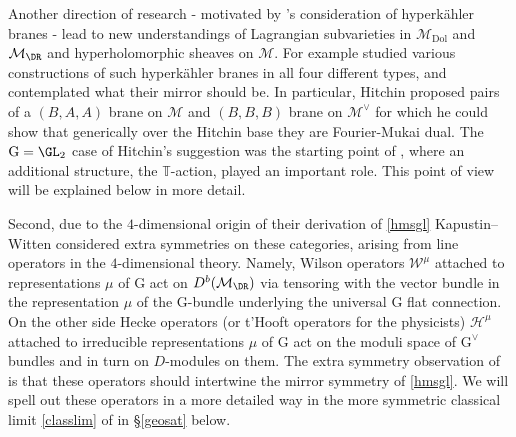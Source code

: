 \documentclass[12pt]{article}
\numberwithin{equation}{section}
\theoremstyle{remark}
\numberwithin{theorem}{section}
\def\M{{\mathcal{M}}}
\newcommand{\T}{{\mathbb{T}}}
\newcommand{\G}{\mathrm{G}}
\newcommand{\Dol}{{\mathrm{Dol}}}
\numberwithin{equation}{section}
\begin{document}

Another direction of research - motivated by \cite{kapustin-witten}'s consideration of hyperk\"ahler branes - lead to new understandings of Lagrangian subvarieties  in $\M_\Dol$ and $\M_\DR$ and hyperholomorphic sheaves on $\M$. For example \cite{baraglia-schaposnik,garcia-prada-etal,hitchin-characteristic} studied various constructions of such hyperk\"ahler branes in all four different types, and contemplated  what their mirror should be. In particular, Hitchin \cite{hitchin-characteristic} proposed pairs of a $(B,A,A)$ brane on $\M$ and $(B,B,B)$ brane on $\M^\vee$ for which he could show that generically over the Hitchin base they are Fourier-Mukai dual. The $\G=\GL_2$ case of Hitchin's suggestion was the starting point of \cite{hausel-mellit-pei}, where an additional structure, the $\T$-action, played an important role. This point of view will be explained below in more detail. 

Second, due to the $4$-dimensional origin of their derivation of \eqref{hmsgl} Kapustin--Witten considered extra symmetries on these categories, arising from line operators in the $4$-dimensional theory. Namely, Wilson operators $\mathscr{W}^\mu$ attached to representations $\mu$ of $\G$ act on $D^b(\M_\DR)$ via tensoring with the vector bundle in the representation $\mu$ of the $\G$-bundle underlying the universal $\G$ flat connection.  On the other side Hecke operators (or t'Hooft operators for the physicists) $\mathscr{H}^\mu$ attached to irreducible representations $\mu$ of $\G$ act on the moduli space of $\G^\vee$ bundles and in turn on $D$-modules on them. The extra symmetry observation of \cite{kapustin-witten} is that these operators should intertwine the mirror symmetry of \eqref{hmsgl}. We will spell out these operators in  a more detailed way in the more symmetric classical limit \eqref{classlim} of \cite{donagi-pantev} in \S\ref{geosat}   below.  

\end{document}
